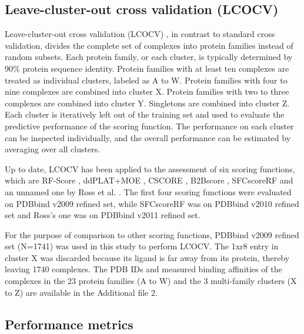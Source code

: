 \documentclass[linenumbers]{bmcart}
\begin{document}
\subsection*{Leave-cluster-out cross validation (LCOCV)}

Leave-cluster-out cross validation (LCOCV) \cite{774}, in contrast to standard cross validation, divides the complete set of complexes into protein families instead of random subsets. Each protein family, or each cluster, is typically determined by 90\% protein sequence identity. Protein families with at least ten complexes are treated as individual clusters, labeled as A to W. Protein families with four to nine complexes are combined into cluster X. Protein families with two to three complexes are combined into cluster Y. Singletons are combined into cluster Z. Each cluster is iteratively left out of the training set and used to evaluate the predictive performance of the scoring function. The performance on each cluster can be inspected individually, and the overall performance can be estimated by averaging over all clusters.

Up to date, LCOCV has been applied to the assessment of six scoring functions, which are RF-Score \cite{774,1194,1410}, ddPLAT+MOE \cite{1414}, CSCORE \cite{1194}, B2Bscore \cite{1410}, SFCscoreRF \cite{1347} and an unnamed one by Ross et al. \cite{1415}. The first four scoring functions were evaluated on PDBbind v2009 refined set, while SFCscoreRF was on PDBbind v2010 refined set and Ross's one was on PDBbind v2011 refined set.

For the purpose of comparison to other scoring functions, PDBbind v2009 refined set (N=1741) was used in this study to perform LCOCV. The 1xr8 entry in cluster X was discarded because its ligand is far away from its protein, thereby leaving 1740 complexes. The PDB IDs and measured binding affinities of the complexes in the 23 protein families (A to W) and the 3 multi-family clusters (X to Z) are available in the Additional file 2.

\subsection*{Performance metrics}
\end{document}
